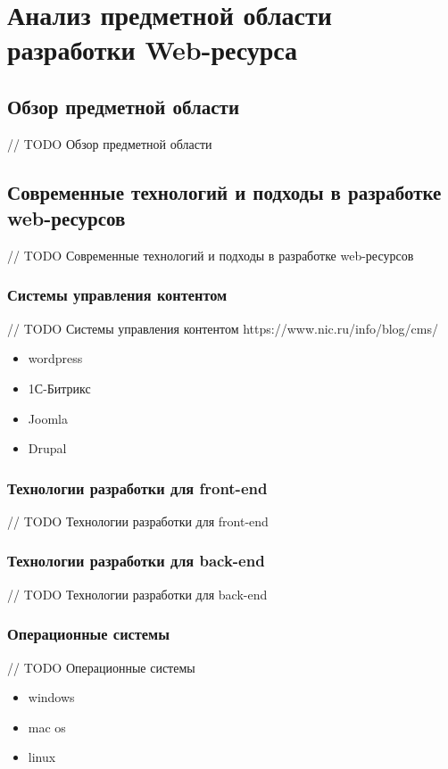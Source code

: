 \section{Анализ предметной области разработки Web-ресурса}
\subsection{Обзор предметной области}
// TODO Обзор предметной области

\subsection{Современные технологий и подходы в разработке web-ресурсов}
    // TODO Современные технологий и подходы в разработке web-ресурсов
    \subsubsection{Системы управления контентом}
    // TODO Системы управления контентом
        https://www.nic.ru/info/blog/cms/
        \begin{itemize}
            \item wordpress
            \item 1С-Битрикс
            \item Joomla
            \item Drupal
        \end{itemize}

    \subsubsection{Технологии разработки для front-end}
    // TODO Технологии разработки для front-end
    
    \subsubsection{Технологии разработки для back-end}
    // TODO Технологии разработки для back-end

    \subsubsection{Операционные системы}
    // TODO Операционные системы
        \begin{itemize}
            \item windows
            \item mac os
            \item linux
        \end{itemize}
        
